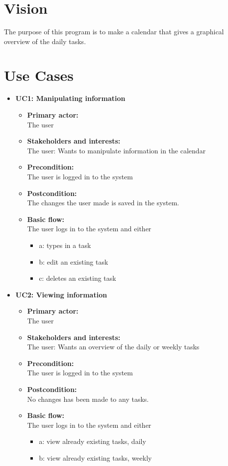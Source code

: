 \documentclass[a4paper, 10pt]{article}
\author{Andreas Precht Poulsen & Christian Rostrup Nielsen & Test}
\begin{document}
\section{Vision}
The purpose of this program is to make a calendar that gives a graphical overview of the daily tasks.

\section{Use Cases}

\begin{itemize}
\item \textbf{UC1: Manipulating information}
	\begin{itemize}
	\item \textbf{Primary actor:}
		\\The user
	\item \textbf{Stakeholders and interests:}
		\\The user: Wants to manipulate information in the calendar
	\item \textbf{Precondition:}
		\\The user is logged in to the system
	\item \textbf{Postcondition:}
		\\The changes the user made is saved in the system.
	\item \textbf{Basic flow:}
		\\The user logs in to the system and either
		\begin{itemize}
			\item a: types in a task
			\item b: edit an existing task
			\item c: deletes an existing task
		\end{itemize}
	\end{itemize}

\item \textbf{UC2: Viewing information}
	\begin{itemize}
	\item \textbf{Primary actor:}
		\\The user
	\item \textbf{Stakeholders and interests:}
		\\The user: Wants an overview of the daily or weekly tasks
	\item \textbf{Precondition:}
		\\The user is logged in to the system
	\item \textbf{Postcondition:}
		\\No changes has been made to any tasks.
	\item \textbf{Basic flow:}
		\\The user logs in to the system and either
		\begin{itemize}
			\item a: view already existing tasks, daily
			\item b: view already existing tasks, weekly
		\end{itemize}
	\end{itemize}
\end{itemize}
\end{document}
